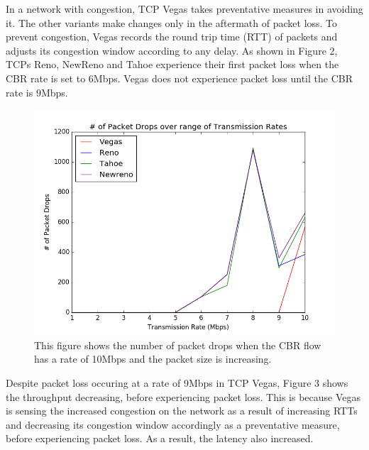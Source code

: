 In a network with congestion, TCP Vegas takes preventative measures in avoiding it. The other variants make changes only in the aftermath of packet loss. To prevent congestion, Vegas records the round trip time (RTT) of packets and adjusts its congestion window according to any delay. As shown in Figure 2, TCPs Reno, NewReno and Tahoe experience their first packet loss when the CBR rate is set to 6Mbps. Vegas does not experience packet loss until the CBR rate is 9Mbps.

\begin{figure}[!htbp]
	\includegraphics[scale=0.4]{PDrops.png}
	\caption{This figure shows the number of packet drops when the CBR flow has a rate of 10Mbps and the packet size is increasing.}
	\label{a:label}
\end{figure}

Despite packet loss occuring at a rate of 9Mbps in TCP Vegas, Figure 3 shows the throughput decreasing, before experiencing packet loss. This is because Vegas is sensing the increased congestion on the network as a result of increasing RTTs and decreasing its congestion window accordingly as a preventative measure, before experiencing packet loss. As a result, the latency also increased.

